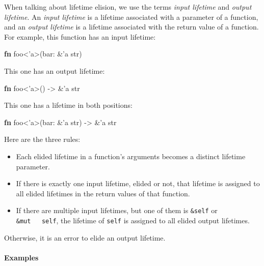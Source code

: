 \documentclass[a4paper,]{book}
\newenvironment{Shaded}{\begin{snugshade}}{\end{snugshade}}
\newcommand{\KeywordTok}[1]{\textcolor[rgb]{0.13,0.29,0.53}{\textbf{{#1}}}}
\newcommand{\DataTypeTok}[1]{\textcolor[rgb]{0.13,0.29,0.53}{{#1}}}
\newcommand{\OtherTok}[1]{\textcolor[rgb]{0.56,0.35,0.01}{{#1}}}
\newcommand{\NormalTok}[1]{{#1}}
\let\oldparagraph\paragraph
\renewcommand{\paragraph}[1]{\oldparagraph{#1}\mbox{}}
\begin{document}
When talking about lifetime elision, we use the terms \emph{input
lifetime} and \emph{output lifetime}. An \emph{input lifetime} is a
lifetime associated with a parameter of a function, and an \emph{output
lifetime} is a lifetime associated with the return value of a function.
For example, this function has an input lifetime:

\begin{Shaded}
\begin{Highlighting}[]
\KeywordTok{fn} \NormalTok{foo<}\OtherTok{'a}\NormalTok{>(bar: &}\OtherTok{'a} \DataTypeTok{str}\NormalTok{)}
\end{Highlighting}
\end{Shaded}

This one has an output lifetime:

\begin{Shaded}
\begin{Highlighting}[]
\KeywordTok{fn} \NormalTok{foo<}\OtherTok{'a}\NormalTok{>() -> &}\OtherTok{'a} \DataTypeTok{str}
\end{Highlighting}
\end{Shaded}

This one has a lifetime in both positions:

\begin{Shaded}
\begin{Highlighting}[]
\KeywordTok{fn} \NormalTok{foo<}\OtherTok{'a}\NormalTok{>(bar: &}\OtherTok{'a} \DataTypeTok{str}\NormalTok{) -> &}\OtherTok{'a} \DataTypeTok{str}
\end{Highlighting}
\end{Shaded}

Here are the three rules:

\begin{itemize}
\item
  Each elided lifetime in a function's arguments becomes a distinct
  lifetime parameter.
\item
  If there is exactly one input lifetime, elided or not, that lifetime
  is assigned to all elided lifetimes in the return values of that
  function.
\item
  If there are multiple input lifetimes, but one of them is
  \texttt{\&self} or \texttt{\&mut\ \ \ self}, the lifetime of
  \texttt{self} is assigned to all elided output lifetimes.
\end{itemize}

Otherwise, it is an error to elide an output lifetime.

\paragraph{Examples}\label{examples}
\end{document}
